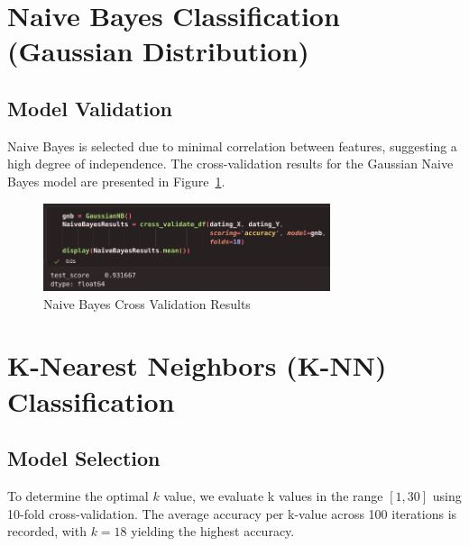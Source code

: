 \documentclass{article}
\begin{document}
\newpage

\section{Naive Bayes Classification (Gaussian Distribution)}
\subsection{Model Validation}
Naive Bayes is selected due to minimal correlation between features, suggesting a high degree of independence. The cross-validation results for the Gaussian Naive Bayes model are presented in Figure~\ref{fig:nb-results}.

\begin{figure}[H]
    \centering
    \includegraphics[width=0.75\textwidth]{NB_results.png}
    \caption{Naive Bayes Cross Validation Results}
    \label{fig:nb-results}
\end{figure}

\section{K-Nearest Neighbors (K-NN) Classification}
\subsection{Model Selection}
To determine the optimal $k$ value, we evaluate k values in the range $[1,30]$ using 10-fold cross-validation. The average accuracy per k-value across 100 iterations is recorded, with $k=18$ yielding the highest accuracy.
\end{document}
